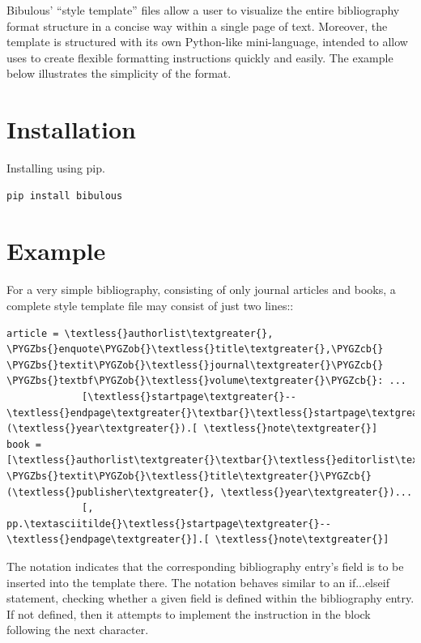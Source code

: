 \documentclass[letterpaper,10pt,english]{sphinxmanual}
\def\PYGZbs{\char`\\}
\def\PYGZob{\char`\{}
\def\PYGZcb{\char`\}}
\begin{document}
Bibulous' “style template” files allow a user to visualize the entire bibliography format structure in a concise way within a single page of text. Moreover, the template is structured with its own Python-like mini-language, intended to allow uses to create flexible formatting instructions quickly and easily. The example below illustrates the simplicity of the format.


\section{Installation}
\label{index:installation}
Installing using pip.

\begin{Verbatim}[commandchars=\\\{\}]
pip install bibulous
\end{Verbatim}


\section{Example}
\label{index:example}
For a very simple bibliography, consisting of only journal articles and books, a complete style template file may consist of just two lines::

\begin{Verbatim}[commandchars=\\\{\}]
article = \textless{}authorlist\textgreater{}, \PYGZbs{}enquote\PYGZob{}\textless{}title\textgreater{},\PYGZcb{} \PYGZbs{}textit\PYGZob{}\textless{}journal\textgreater{}\PYGZcb{} \PYGZbs{}textbf\PYGZob{}\textless{}volume\textgreater{}\PYGZcb{}: ...
             [\textless{}startpage\textgreater{}--\textless{}endpage\textgreater{}\textbar{}\textless{}startpage\textgreater{}\textbar{}\textless{}eid\textgreater{}\textbar{}] (\textless{}year\textgreater{}).[ \textless{}note\textgreater{}]
book = [\textless{}authorlist\textgreater{}\textbar{}\textless{}editorlist\textgreater{}\textbar{}], \PYGZbs{}textit\PYGZob{}\textless{}title\textgreater{}\PYGZcb{} (\textless{}publisher\textgreater{}, \textless{}year\textgreater{})...
             [, pp.\textasciitilde{}\textless{}startpage\textgreater{}--\textless{}endpage\textgreater{}].[ \textless{}note\textgreater{}]
\end{Verbatim}

The  notation indicates that the corresponding bibliography entry's field is to be inserted into the template there. The \code{{[}...\textbar{}...{]}} notation behaves similar to an if...elseif statement, checking whether a given field is defined within the bibliography entry. If not defined, then it attempts to implement the instruction in the block following the next \textbar{} character.
\end{document}
